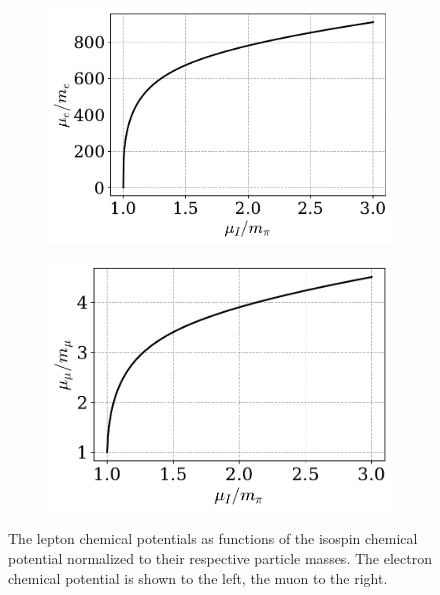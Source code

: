 \begin{figure}[H]
    \centering
    \begin{subfigure}{0.45 \textwidth}
        \includegraphics[width=\textwidth]{../scripts/figurer/charge_neutrality/chemical_potential_e.pdf}
    \end{subfigure}
    \begin{subfigure}{0.43\textwidth}
        \includegraphics[width=\textwidth]{../scripts/figurer/charge_neutrality/chemical_potential_mu.pdf}
    \end{subfigure} 
    \caption{
        The lepton chemical potentials as functions of the isospin chemical potential normalized to their respective particle masses.
        The electron chemical potential is shown to the left, the muon to the right.
    } 
    \label{fig: chemical potentials}
\end{figure}


